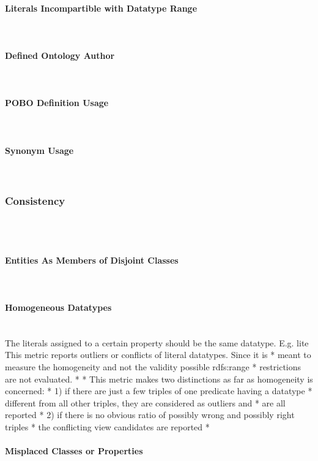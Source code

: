 \paragraph{Literals Incompartible with Datatype Range} ~\\ 

\paragraph{Defined Ontology Author} ~\\ 
\paragraph{POBO Definition Usage}~\\ 
\paragraph{Synonym Usage}~\\ 
\subsubsection{Consistency}~\\ 
\

\paragraph{Entities As Members of Disjoint Classes}~\\


\paragraph{Homogeneous Datatypes}~\\
The literals assigned to a certain property should be the same datatype.
E.g. lite 
This metric reports outliers or conflicts of literal datatypes. Since it is
 * meant to measure the homogeneity and not the validity possible rdfs:range
 * restrictions are not evaluated.
 * 
 * This metric makes two distinctions as far as homogeneity is concerned:
 * 1) if there are just a few triples of one predicate having a datatype
 *    different from all other triples, they are considered as outliers and
 *    are all reported
 * 2) if there is no obvious ratio of possibly wrong and possibly right triples
 *    the conflicting view candidates are reported
 * 
\paragraph{Misplaced Classes or Properties}

